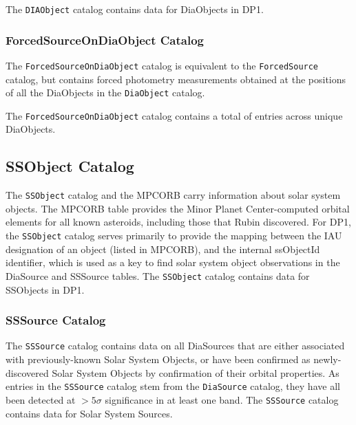The \texttt{DIAObject} catalog contains data for \ndiaobjects DiaObjects in \gls{DP1}.

\subsubsection{ForcedSourceOnDiaObject Catalog}
The \texttt{ForcedSourceOnDiaObject} catalog \citep{10.71929/rubin/2570321} is equivalent to the \texttt{ForcedSource} catalog, but contains \gls{forced photometry} measurements obtained at the positions of all the DiaObjects in the \texttt{DiaObject} catalog.

The \texttt{ForcedSourceOnDiaObject} catalog contains a total of \ndiaforcedsources entries across \ndiaforcedobjects unique DiaObjects.

\subsection{SSObject Catalog}
The \texttt{SSObject} catalog \citep{10.71929/rubin/2570335} and the \gls{MPCORB} carry information about solar system objects.
The \gls{MPCORB} table provides the Minor Planet \gls{Center}-computed orbital elements for all known asteroids, including those that Rubin discovered.
For \gls{DP1}, the  \texttt{SSObject} catalog serves primarily to provide the mapping between the \gls{IAU} designation of an object (listed in \gls{MPCORB}), and the internal ssObjectId identifier, which is used as a key to find solar system object observations in the DiaSource and SSSource tables.
The \texttt{SSObject} catalog contains data for \nssobjects SSObjects in \gls{DP1}.

\subsubsection{SSSource Catalog}
The \texttt{SSSource} catalog \citep{10.71929/rubin/2570333} contains data on all DiaSources that are either associated with previously-known Solar System Objects, or have been confirmed as newly-discovered Solar System Objects by confirmation of their orbital properties.
As entries in the \texttt{SSSource} catalog stem from the \texttt{DiaSource} catalog, they have all been detected at $>5\sigma$ significance in at least one band.
The \texttt{SSSource} catalog contains data for \nsolarsystemsources Solar System Sources.

